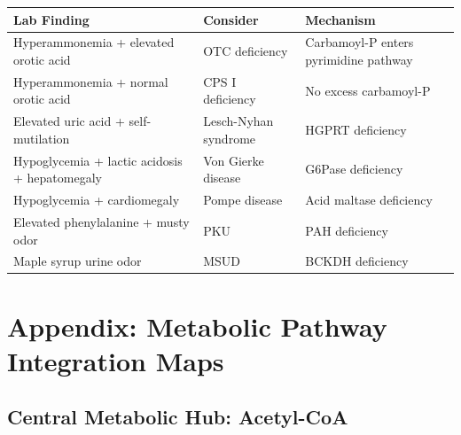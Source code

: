 \begin{center}
\begin{tabular}{p{4cm}p{5cm}p{5cm}}
\toprule
\textbf{Lab Finding} & \textbf{Consider} & \textbf{Mechanism} \\
\midrule
Hyperammonemia + elevated orotic acid & OTC deficiency & Carbamoyl-P enters pyrimidine pathway \\
Hyperammonemia + normal orotic acid & CPS I deficiency & No excess carbamoyl-P \\
Elevated uric acid + self-mutilation & Lesch-Nyhan syndrome & HGPRT deficiency \\
Hypoglycemia + lactic acidosis + hepatomegaly & Von Gierke disease & G6Pase deficiency \\
Hypoglycemia + cardiomegaly & Pompe disease & Acid maltase deficiency \\
Elevated phenylalanine + musty odor & PKU & PAH deficiency \\
Maple syrup urine odor & MSUD & BCKDH deficiency \\
\bottomrule
\end{tabular}
\end{center}


\section{Appendix: Metabolic Pathway Integration Maps}

\subsection{Central Metabolic Hub: Acetyl-CoA}

